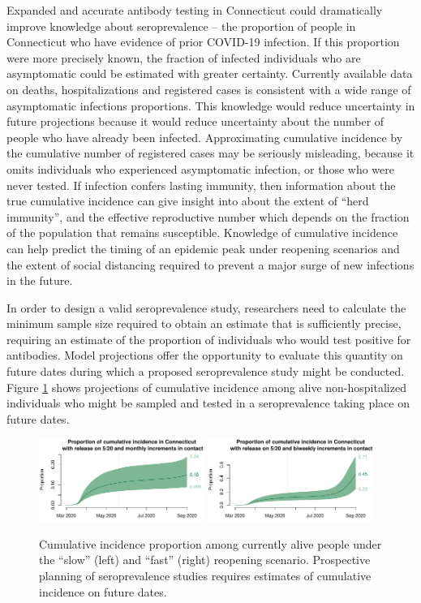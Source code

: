 \documentclass[11pt]{article}
\begin{document}
Expanded and accurate antibody testing in Connecticut could dramatically improve knowledge about seroprevalence -- the proportion of people in Connecticut who have evidence of prior COVID-19 infection. If this proportion were more precisely known, the fraction of infected individuals who are asymptomatic could be estimated with greater certainty.  Currently available data on deaths, hospitalizations and registered cases is consistent with a wide range of asymptomatic infections proportions.  This knowledge would reduce uncertainty in future projections because it would reduce uncertainty about the number of people who have already been infected.  Approximating cumulative incidence by the cumulative number of registered cases may be seriously misleading, because it omits individuals who experienced asymptomatic infection, or those who were never tested.  If infection confers lasting immunity, then information about the true cumulative incidence can give insight into about the extent of ``herd immunity'', and the effective reproductive number which depends on the fraction of the population that remains susceptible. Knowledge of cumulative incidence can help predict the timing of an epidemic peak under reopening scenarios and the extent of social distancing required to prevent a major surge of new infections in the future. 

In order to design a valid seroprevalence study, researchers need to calculate the minimum sample size required to obtain an estimate that is sufficiently precise, requiring an estimate of the proportion of individuals who would test positive for antibodies.  Model projections offer the opportunity to evaluate this quantity on future dates during which a proposed seroprevalence study might be conducted.  Figure \ref{fig:cumincidence} shows projections of cumulative incidence among alive non-hospitalized individuals who might be sampled and tested in a seroprevalence taking place on future dates.  


\begin{figure}
\centering
\includegraphics[width=0.48\textwidth]{figures/cumincidence_slow.pdf}
\includegraphics[width=0.48\textwidth]{figures/cumincidence_fast.pdf}
\caption{Cumulative incidence proportion among currently alive people under the ``slow'' (left) and ``fast'' (right) reopening scenario. Prospective planning of seroprevalence studies requires estimates of cumulative incidence on future dates. }
\label{fig:cumincidence}
\end{figure}
\end{document}
